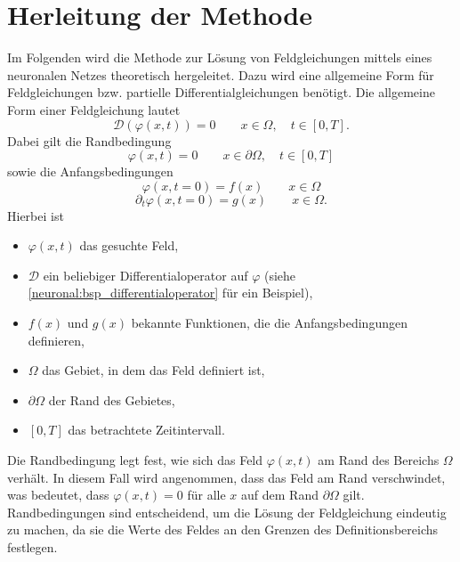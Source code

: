 %
%
%
%

\section{Herleitung der Methode\label{neuronal:section:herleitung}}

Im Folgenden wird die Methode zur Lösung von Feldgleichungen mittels eines neuronalen Netzes theoretisch hergeleitet.
Dazu wird eine allgemeine Form für Feldgleichungen bzw. partielle Differentialgleichungen benötigt.
Die allgemeine Form einer Feldgleichung lautet
\begin{equation}
\mathcal{D}(\varphi(x, t)) = 0 \qquad x \in \Omega, \quad t \in [0,T].
\label{neuronal:generelle_feldgleichung}
\end{equation}
Dabei gilt die Randbedingung
%
\begin{equation}
\varphi(x, t) = 0 \qquad x \in \partial \Omega, \quad t \in [0,T]
\end{equation}
sowie die Anfangsbedingungen
%
\begin{equation}
\varphi(x, t = 0) = f(x) \qquad x \in \Omega 
\label{neuronal:anfangsbedingung_voll}
\end{equation}
\begin{equation}
\partial_t \varphi(x, t = 0) = g(x) \qquad x \in \Omega.
\label{neuronal:anfangsbedingung_partiel}
\end{equation}
Hierbei ist
\begin{itemize}
    \item $\varphi(x, t)$ das gesuchte Feld,
    \item $\mathcal{D}$ ein beliebiger Differentialoperator auf $\varphi$ (siehe \eqref{neuronal:bsp_differentialoperator} für ein Beispiel),
    \item $f(x)$ und $g(x)$ bekannte Funktionen, die die Anfangsbedingungen definieren,
    \item $\Omega$ das Gebiet, in dem das Feld definiert ist,
    \item $\partial \Omega$ der Rand des Gebietes,
    \item $[0,T]$ das betrachtete Zeitintervall.
\end{itemize}

Die Randbedingung legt fest, wie sich das Feld $\varphi(x, t)$ am Rand des Bereichs $\Omega$ verhält.
In diesem Fall wird angenommen, dass das Feld am Rand verschwindet, was bedeutet, dass $\varphi(x, t) = 0$ für alle $x$ auf dem Rand $\partial \Omega$ gilt.
Randbedingungen sind entscheidend, um die Lösung der Feldgleichung eindeutig zu machen, da sie die Werte des Feldes an den Grenzen des Definitionsbereichs festlegen.


